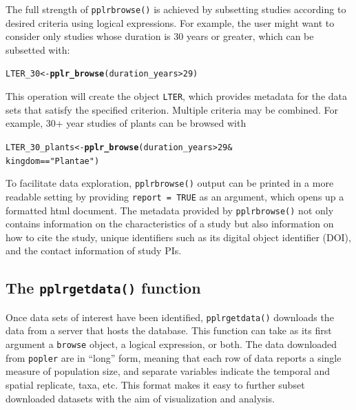 \documentclass{article}\usepackage[]{graphicx}\usepackage[]{color}
\makeatletter
\newcommand{\hlnum}[1]{\textcolor[rgb]{0.686,0.059,0.569}{#1}}%
\newcommand{\hlstr}[1]{\textcolor[rgb]{0.192,0.494,0.8}{#1}}%
\newcommand{\hlopt}[1]{\textcolor[rgb]{0,0,0}{#1}}%
\newcommand{\hlstd}[1]{\textcolor[rgb]{0.345,0.345,0.345}{#1}}%
\newcommand{\hlkwb}[1]{\textcolor[rgb]{0.69,0.353,0.396}{#1}}%
\newcommand{\hlkwd}[1]{\textcolor[rgb]{0.737,0.353,0.396}{\textbf{#1}}}%
\newenvironment{kframe}{%
 \def\at@end@of@kframe{}%
 \ifinner\ifhmode%
  \def\at@end@of@kframe{\end{minipage}}%
  \begin{minipage}{\columnwidth}%
 \fi\fi%
 \def\FrameCommand##1{\hskip\@totalleftmargin \hskip-\fboxsep
 \colorbox{shadecolor}{##1}\hskip-\fboxsep
     \hskip-\linewidth \hskip-\@totalleftmargin \hskip\columnwidth}%
 \MakeFramed {\advance\hsize-\width
   \@totalleftmargin\z@ \linewidth\hsize
   \@setminipage}}%
 {\par\unskip\endMakeFramed%
 \at@end@of@kframe}
\newenvironment{knitrout}{}{} %
\makeatother
\begin{document}
The full strength of \texttt{pplr\textunderscore browse()} is achieved by subsetting studies according to desired criteria using logical expressions. For example, the user might want to consider only studies whose duration is 30 years or greater, which can be subsetted with:
\begin{knitrout}
\color{fgcolor}\begin{kframe}
\begin{alltt}
\hlstd{LTER_30} \hlkwb{<-} \hlkwd{pplr_browse}\hlstd{( duration_years} \hlopt{>} \hlnum{29}\hlstd{)}
\end{alltt}
\end{kframe}
\end{knitrout}
This operation will create the object \texttt{LTER}, which provides metadata for the data sets that satisfy the specified criterion. Multiple criteria may be combined. For example, 30+ year studies of plants can be browsed with
\begin{knitrout}
\color{fgcolor}\begin{kframe}
\begin{alltt}
\hlstd{LTER_30_plants} \hlkwb{<-} \hlkwd{pplr_browse}\hlstd{( duration_years} \hlopt{>} \hlnum{29} \hlopt{&}
                               \hlstd{kingdom} \hlopt{==} \hlstr{"Plantae"}\hlstd{)}
\end{alltt}
\end{kframe}
\end{knitrout}
To facilitate data exploration, \texttt{pplr\textunderscore browse()} output can be printed in a more readable setting by providing \texttt{report = TRUE} as an argument, which opens up a formatted html document. The metadata provided by \texttt{pplr\textunderscore browse()} not only contains information on the characteristics of a study but also information on how to cite the study, unique identifiers such as its digital object identifier (DOI), and the contact information of study PIs. 


\subsection*{The \texttt{pplr\textunderscore get\textunderscore data()} function}

Once data sets of interest have been identified, \texttt{pplr\textunderscore get\textunderscore data()} downloads the data from a server that hosts the database. This function can take as its first argument a \texttt{browse} object, a logical expression, or both. The data downloaded from \texttt{popler} are in ``long'' form, meaning that each row of data reports a single measure of population size, and separate variables indicate the temporal and spatial replicate, taxa, etc. This format makes it easy to further subset downloaded datasets with the aim of visualization and analysis. 
\end{document}
